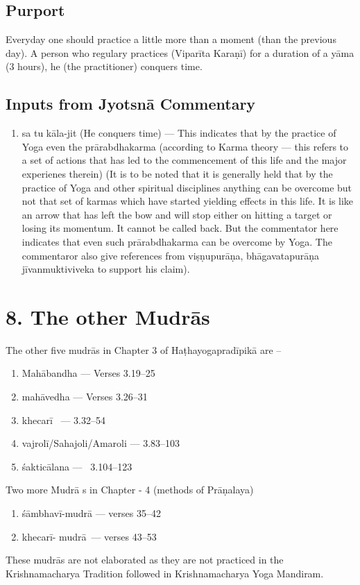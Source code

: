 \subsection*{Purport}

Everyday one should practice a little more than a moment (than the previous day). A person who regulary practices (Viparīta Karaṇī) for a duration of a yāma (3 hours), he (the practitioner) conquers time.

\subsection*{Inputs from Jyotsnā Commentary}

\begin{enumerate}
\item sa tu kāla-jit (He conquers time) --- This indicates that by the practice of Yoga even the prārabdhakarma (according to Karma theory --- this refers to a set of actions that has led to the commencement of this life and the major experienes therein) (It is to be noted that it is generally held that by the practice of Yoga and other spiritual disciplines anything can be overcome but not that set of karmas which have started yielding effects in this life. It is like an arrow that has left the bow and will stop either on hitting a target or losing its momentum. It cannot be called back. But the commentator here indicates that even such prārabdhakarma can be overcome by Yoga. The commentaror also give references from viṣṇupurāṇa, bhāgavatapurāṇa jīvanmuktiviveka to support his claim). 
\end{enumerate}
\newpage

\section*{8. The other Mudrās}

The other five mudrās in Chapter 3 of Haṭhayogapradīpikā are – 

\begin{enumerate}
\item Mahābandha --- Verses 3.19--25 
\item mahāvedha  --- Verses 3.26--31
\item khecarī  --- 3.32--54
\item vajrolī/Sahajoli/Amaroli  --- 3.83--103 
\item śakticālana ---  3.104--123 
\end{enumerate}

Two more Mudrā s in Chapter - 4 (methods of Prāṇalaya)

\begin{enumerate}
\item śāmbhavī-mudrā --- verses 35--42
\item khecarī- mudrā --- verses 43--53
\end{enumerate}

These mudrās are not elaborated as they are not practiced in the Krishnamacharya Tradition followed in Krishnamacharya Yoga Mandiram.

